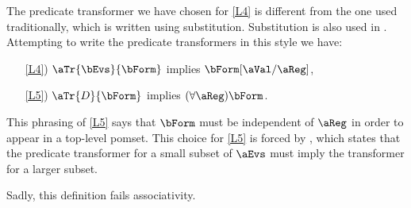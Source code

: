 \begin{example}
  \label{ex:skolem}
  The predicate transformer we have chosen for \ref{L4} is different from the
  one used traditionally, which is written using substitution.  Substitution
  is also used in \jjr{}.  Attempting to
  write the predicate transformers in this style we have:
  \begin{enumerate}[topsep=0pt]
  \item[\ref{L4})]
    $\aTr{\bEvs}{\bForm}$ implies $\bForm[\aVal/\aReg]$, 
  \item[\ref{L5})]
    $\aTr{\cEvs}{\bForm}$ implies $(\forall\aReg)\bForm$.
  \end{enumerate}
  This phrasing of \ref{L5} says that $\bForm$ must be independent of $\aReg$
  in order to appear in a top-level pomset.  This choice for \ref{L5} is forced
  by , which states that the predicate transformer for a
  small subset of $\aEvs$ must imply the transformer for a larger subset.

  Sadly, this definition fails associativity.


\end{example}
